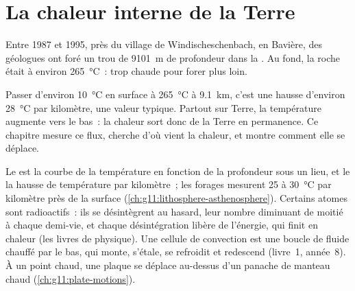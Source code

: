 \chapter{La chaleur interne de la Terre}\label{ch:g12:internal-heat}

Entre 1987 et 1995, près du village de Windischeschenbach, en Bavière, des
géologues ont foré un trou de \qty{9101}{m} de profondeur dans la . Au fond, la roche était à environ \qty{265}{\celsius}~: trop
chaude pour forer plus loin.

Passer d'environ \qty{10}{\celsius} en surface à \qty{265}{\celsius} à
\qty{9.1}{km}, c'est une hausse d'environ \qty{28}{\celsius} par
kilomètre, une valeur typique. Partout sur Terre, la température augmente
vers le bas~: la chaleur sort donc de la Terre en permanence. Ce chapitre
mesure ce flux, cherche d'où vient la chaleur, et montre comment elle se
déplace.

\begin{recall}
Le  est la courbe de la température en fonction de la profondeur
sous un lieu, et le  la hausse de température par
kilomètre~; les forages mesurent 25 à \qty{30}{\celsius} par kilomètre
près de la surface (\cref{ch:g11:lithosphere-asthenosphere}). Certains
atomes sont radioactifs~: ils se désintègrent au hasard, leur nombre
diminuant de moitié à chaque demi-vie, et chaque désintégration libère de
l'énergie, qui finit en chaleur (les livres de physique). Une cellule de
convection est une boucle de fluide chauffé par le bas, qui monte, s'étale,
se refroidit et redescend (livre~1, année~8). À un point chaud, une plaque
se déplace au-dessus d'un panache de manteau chaud
(\cref{ch:g11:plate-motions}).
\end{recall}

